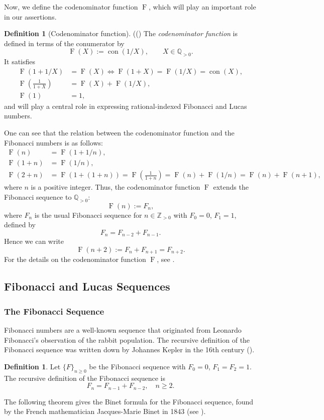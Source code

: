 \documentclass[11pt,reqno]{amsart}
\numberwithin{equation}{section}
\numberwithin{table}{section}
\numberwithin{figure}{section}
\DeclareMathOperator{\con}{con}
\DeclareMathOperator{\F}{F}
\theoremstyle{plain}
\theoremstyle{definition}
\newtheorem{definition}[thm]{Definition}
\theoremstyle{remark}
\begin{document}
Now, we define the codenominator function $\F$, which will play an important role in our assertions.\begin{definition}[Codenominator function]{\normalfont((\cite{ULUDAG2022103192})}	The \emph{codenominator function} is defined in terms of the conumerator by	\begin{equation}		\F(X) := \con(1/X), \qquad X\in \mathbb{Q}_{>0}.	\end{equation}	It satisfies 	\begin{align}		\F(1+1/X) &= \F(X) \iff \F(1+X) = \F(1/X) = \con(X),\label{F:1}\\		\F\!\left(\tfrac{1}{1+X}\right) &= \F(X) + \F(1/X),\label{F:2}\\		\F(1)& = 1,	\end{align}	and will play a central role in expressing rational-indexed Fibonacci and Lucas numbers.\end{definition}One can see that the relation between the codenominator function and the Fibonacci numbers is as follows:\begin{align}	\F(n)& = \F(1+1/n),\\	\F(1+n) & = \F(1/n),\\	\F(2+n) &= \F(1+(1+n)) =\F\!\left(\tfrac{1}{1+n}\right) = \F(n) + \F(1/n) = \F(n) + \F(n+1),\end{align}where $n$ is a positive integer. Thus, the codenominator function $\F$ extends the Fibonacci sequence to $\mathbb{Q}_{>0}$:\begin{equation}	\F(n) := F_n,\end{equation}where $F_n$ is the usual Fibonacci sequence for $n \in \mathbb{Z}_{>0}$ with $F_0 = 0$, $F_1=1$, defined by\begin{equation}	F_{n} = F_{n-2} + F_{n-1}.\end{equation}Hence we can write\begin{equation}	\F(n+2) := F_n + F_{n+1} = F_{n+2}.\end{equation}For the details on the codenominator function $\F$, see \cite{ULUDAG2022103192}.\subsection{Fibonacci and Lucas Sequences}\subsubsection{The Fibonacci Sequence}Fibonacci numbers are a well-known sequence that originated from Leonardo Fibonacci's observation of the rabbit population. The recursive definition of the Fibonacci sequence was written down by Johannes Kepler in the 16th century (\cite{koshy2017fibonacci}).\begin{definition}	Let $\{F\}_{n\geq 0}$ be the Fibonacci sequence with $F_0 = 0$, $F_1 = F_2 = 1$. The recursive definition of the Fibonacci sequence is	\begin{equation}		F_n = F_{n-1} + F_{n-2}, \quad n\geq 2.	\end{equation}\end{definition}The following theorem gives the Binet formula for the Fibonacci sequence, found by the French mathematician Jacques-Marie Binet in 1843 (see \cite[p.~90]{koshy2019fibonacci}).
\end{document}
